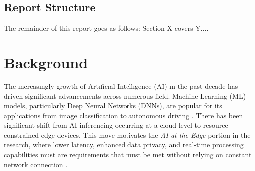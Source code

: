 \documentclass[12pt, a4paper, ukenglish]{article}
\begin{document}
    
    
    
    \subsection{Report Structure}
    The remainder of this report goes as follows: Section X covers Y....

\clearpage  
\newpage
\section{Background} \label{sec: background}
    The increasingly growth of Artificial Intelligence (AI) in the past decade has driven significant advancements across numerous field. Machine Learning (ML) models, particularly Deep Neural Networks (DNNs), are popular for its applications from image classification to autonomous driving \cite{parashar_scnn_2017}. There has been significant shift from AI inferencing occurring at a cloud-level to resource-constrained edge devices. This move motivates the \textit{AI at the Edge} portion in the research, where lower latency, enhanced data privacy, and real-time processing capabilities must are requirements that must be met without relying on constant network connection \cite{kim_energy-efficient_2020}.
\end{document}
